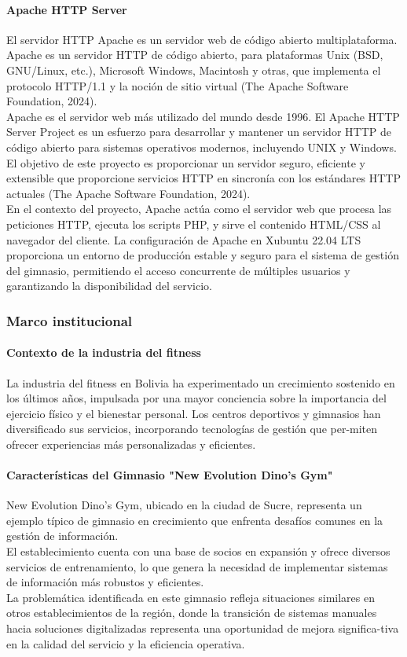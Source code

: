 \documentclass[12pt, letterpaper]{article}
\begin{document}
\paragraph{\textbf{Apache HTTP Server}}
El servidor HTTP Apache es un servidor web de código abierto multiplataforma. Apache es un servidor HTTP de código abierto, para plataformas Unix (BSD, GNU/Linux, etc.), Microsoft Windows, Macintosh y otras, que implementa el protocolo HTTP/1.1 y la noción de sitio virtual (The Apache Software Foundation, 2024).\\
Apache es el servidor web más utilizado del mundo desde 1996. El Apache HTTP Server Project es un esfuerzo para desarrollar y mantener un servidor HTTP de código abierto para sistemas operativos modernos, incluyendo UNIX y Windows. El objetivo de este proyecto es proporcionar un servidor seguro, eficiente y extensible que proporcione servicios HTTP en sincronía con los estándares HTTP actuales (The Apache Software Foundation, 2024).\\
En el contexto del proyecto, Apache actúa como el servidor web que procesa las peticiones HTTP, ejecuta los scripts PHP, y sirve el contenido HTML/CSS al navegador del cliente. La configuración de Apache en Xubuntu 22.04 LTS proporciona un entorno de producción estable y seguro para el sistema de gestión del gimnasio, permitiendo el acceso concurrente de múltiples usuarios y garantizando la disponibilidad del servicio.\\

\subsubsection{Marco institucional}
\paragraph{\textbf{Contexto de la industria del fitness}}
La industria del fitness en Bolivia ha experimentado un crecimiento sostenido en los últimos años, impulsada por una mayor conciencia sobre la importancia del ejercicio físico y el bienestar personal. Los centros deportivos y gimnasios han diversificado sus servicios, incorporando tecnologías de gestión que per-miten ofrecer experiencias más personalizadas y eficientes.
\paragraph{\textbf{Características del Gimnasio "New Evolution Dino's Gym"}}
New Evolution Dino's Gym, ubicado en la ciudad de Sucre, representa un ejemplo típico de gimnasio en crecimiento que enfrenta desafíos comunes en la gestión de información.\\
El establecimiento cuenta con una base de socios en expansión y ofrece diversos servicios de entrenamiento, lo que genera la necesidad de implementar sistemas de información más robustos y eficientes.\\
La problemática identificada en este gimnasio refleja situaciones similares en otros establecimientos de la región, donde la transición de sistemas manuales hacia soluciones digitalizadas representa una oportunidad de mejora significa-tiva en la calidad del servicio y la eficiencia operativa.
\end{document}
